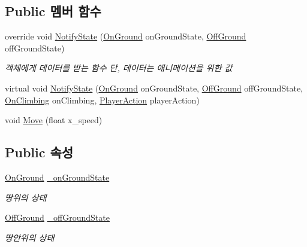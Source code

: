 \subsection*{Public 멤버 함수}
\begin{DoxyCompactItemize}
\item 
override void \mbox{\hyperlink{class_player_state_a59f3f64c24ba1b6e34e34cb23746ecb0}{Notify\+State}} (\mbox{\hyperlink{class_state_ab9eb1c1d81f1903b8486d1275e78b68e}{On\+Ground}} on\+Ground\+State, \mbox{\hyperlink{class_state_a7d945e793324c017a973205564cf1a56}{Off\+Ground}} off\+Ground\+State)
\begin{DoxyCompactList}\small\item\em 객체에게 데이터를 받는 함수 단, 데이터는 애니메이션을 위한 값 \end{DoxyCompactList}\item 
virtual void \mbox{\hyperlink{class_player_state_a5fd8b8df346a045643621b312317de72}{Notify\+State}} (\mbox{\hyperlink{class_state_ab9eb1c1d81f1903b8486d1275e78b68e}{On\+Ground}} on\+Ground\+State, \mbox{\hyperlink{class_state_a7d945e793324c017a973205564cf1a56}{Off\+Ground}} off\+Ground\+State, \mbox{\hyperlink{class_player_state_a16e115e2b4c8d0420119d6ff2fe8b3bc}{On\+Climbing}} on\+Climbing, \mbox{\hyperlink{class_player_state_a2909421d9f22a750c1b0eacfc9bafb3d}{Player\+Action}} player\+Action)
\item 
void \mbox{\hyperlink{class_state_a4424d0f582fe05b9dc7cec2a0a7c735a}{Move}} (float x\+\_\+speed)
\end{DoxyCompactItemize}
\subsection*{Public 속성}
\begin{DoxyCompactItemize}
\item 
\mbox{\hyperlink{class_state_ab9eb1c1d81f1903b8486d1275e78b68e}{On\+Ground}} \mbox{\hyperlink{class_state_ab3170df5e58f541f39edff3c1278d443}{\+\_\+on\+Ground\+State}}
\begin{DoxyCompactList}\small\item\em 땅위의 상태 \end{DoxyCompactList}\item 
\mbox{\hyperlink{class_state_a7d945e793324c017a973205564cf1a56}{Off\+Ground}} \mbox{\hyperlink{class_state_ad421039bfc35b46969f174c9617ab786}{\+\_\+off\+Ground\+State}}
\begin{DoxyCompactList}\small\item\em 땅안위의 상태 \end{DoxyCompactList}\end{DoxyCompactItemize}
